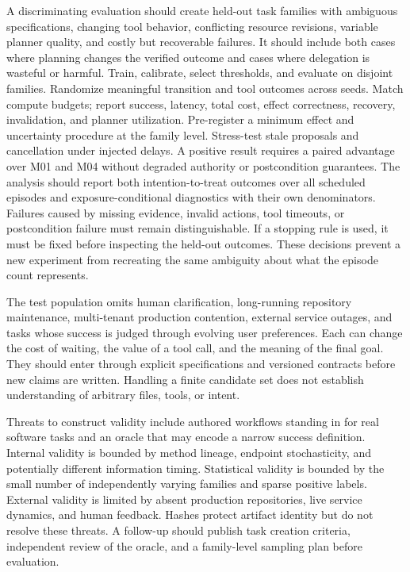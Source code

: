 \documentclass[11pt]{article}
\begin{document}
A discriminating evaluation should create held-out task families with ambiguous specifications, changing tool behavior, conflicting resource revisions, variable planner quality, and costly but recoverable failures. It should include both cases where planning changes the verified outcome and cases where delegation is wasteful or harmful. Train, calibrate, select thresholds, and evaluate on disjoint families. Randomize meaningful transition and tool outcomes across seeds. Match compute budgets; report success, latency, total cost, effect correctness, recovery, invalidation, and planner utilization. Pre-register a minimum effect and uncertainty procedure at the family level. Stress-test stale proposals and cancellation under injected delays. A positive result requires a paired advantage over M01 and M04 without degraded authority or postcondition guarantees. The analysis should report both intention-to-treat outcomes over all scheduled episodes and exposure-conditional diagnostics with their own denominators. Failures caused by missing evidence, invalid actions, tool timeouts, or postcondition failure must remain distinguishable. If a stopping rule is used, it must be fixed before inspecting the held-out outcomes. These decisions prevent a new experiment from recreating the same ambiguity about what the episode count represents.

The test population omits human clarification, long-running repository maintenance, multi-tenant production contention, external service outages, and tasks whose success is judged through evolving user preferences. Each can change the cost of waiting, the value of a tool call, and the meaning of the final goal. They should enter through explicit specifications and versioned contracts before new claims are written. Handling a finite candidate set does not establish understanding of arbitrary files, tools, or intent.

Threats to construct validity include authored workflows standing in for real software tasks and an oracle that may encode a narrow success definition. Internal validity is bounded by method lineage, endpoint stochasticity, and potentially different information timing. Statistical validity is bounded by the small number of independently varying families and sparse positive labels. External validity is limited by absent production repositories, live service dynamics, and human feedback. Hashes protect artifact identity but do not resolve these threats. A follow-up should publish task creation criteria, independent review of the oracle, and a family-level sampling plan before evaluation.
\end{document}
